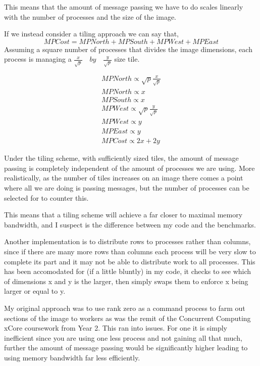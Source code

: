 \documentclass[10pt]{article}
\begin{document}
    This means that the amount of message passing we have to do scales linearly with the number of processes and the size of the image.

    If we instead consider a tiling approach we can say that,
    $$MP Cost = MP North + MP South + MP West + MP East$$
    Assuming a square number of processes that divides the image dimensions, each process is managing a $\frac{x}{\sqrt{p}} \quad by \quad \frac{y}{\sqrt{p}}$ size tile.

    \begin{align*}
      MP North \propto \sqrt{p}\frac{x}{\sqrt{p}} \\
      MP North \propto x \\
      MP South \propto x \\
      MP West \propto \sqrt{p}\frac{y}{\sqrt{p}} \\
      MP West \propto y \\
      MP East \propto y \\
      MP Cost \propto 2x+2y
    \end{align*}

    Under the tiling scheme, with sufficiently sized tiles, the amount of message passing is completely independent of the amount of processes we are using.
    More realistically, as the number of tiles increases on an image there comes a point where all we are doing is passing messages, but the number of processes
    can be selected for to counter this.

    This means that a tiling scheme will achieve a far closer to maximal memory bandwidth, and I suspect is the difference between my code and the benchmarks.

    Another implementation is to distribute rows to processes rather than columns, since if there are many more rows than columns each process will be very slow
    to complete its part and it may not be able to distribute work to all processes. This has been accomodated for (if a little bluntly) in my code, it checks to
    see which of dimensions x and y is the larger, then simply swaps them to enforce x being larger or equal to y.

    My original approach was to use rank zero as a command process to farm out sections of the image to workers as was the remit of the Concurrent Computing
    xCore coursework from Year 2. This ran into issues. For one it is simply inefficient since you are using one less process and not gaining all that much,
    further the amount of message passing would be significantly higher leading to using memory bandwidth far less efficiently.












  
\end{document}
